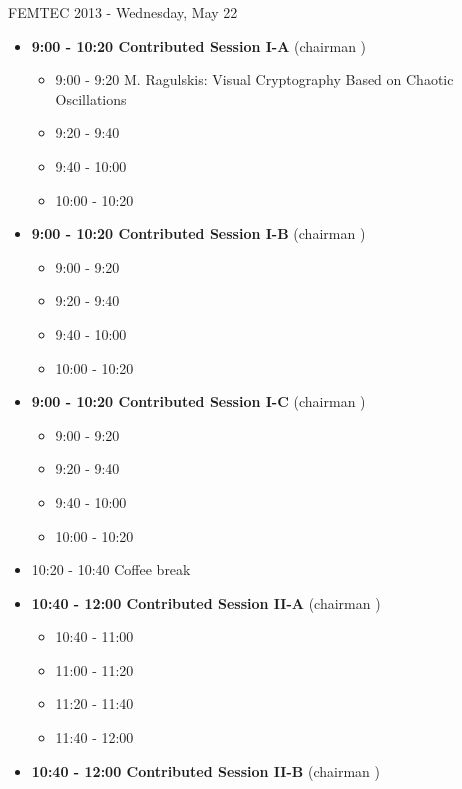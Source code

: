\documentclass[10pt, A4]{article}%
\begin{document}
\begin{itemize}
\begin{itemize}
  \end{itemize}
   
\end{itemize}

\newpage

\centerline{\huge FEMTEC 2013 - Wednesday, May 22}
\vspace{4mm}

\begin{itemize}    
  \item {\bf 9:00 - 10:20 Contributed Session I-A} (chairman ) 
  \begin{itemize}
    \item 9:00 - 9:20 {M. Ragulskis}: {Visual Cryptography Based on Chaotic Oscillations}
    \item 9:20 - 9:40 
    \item 9:40 - 10:00 
    \item 10:00 - 10:20  
  \end{itemize}
  \item {\bf 9:00 - 10:20 Contributed Session I-B} (chairman ) 
  \begin{itemize}
    \item 9:00 - 9:20 
    \item 9:20 - 9:40 
    \item 9:40 - 10:00 
    \item 10:00 - 10:20      
  \end{itemize}
    \item {\bf 9:00 - 10:20 Contributed Session I-C} (chairman ) 
  \begin{itemize}
    \item 9:00 - 9:20 
    \item 9:20 - 9:40 
    \item 9:40 - 10:00 
    \item 10:00 - 10:20      
  \end{itemize}
  \item 10:20 - 10:40 Coffee break
  \item {\bf 10:40 - 12:00 Contributed Session II-A} (chairman ) 
  \begin{itemize}
    \item 10:40 - 11:00
    \item 11:00 - 11:20 
    \item 11:20 - 11:40 
    \item 11:40 - 12:00 
  \end{itemize}
  \item {\bf 10:40 - 12:00 Contributed Session II-B} (chairman ) 

\end{itemize}
\end{document}
